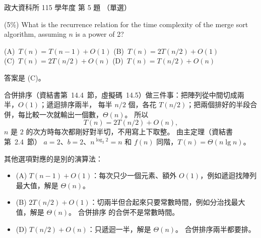\begin{pastexam}[label={px:nccu-115-dsa-05}]{政大資科所 115 學年度 第 5 題}
（單選）

(5\%) What is the recurrence relation for the time complexity of the merge sort algorithm, assuming $n$
is a power of 2?

(A)~$T(n)=T(n-1)+O(1)$ \qquad (B)~$T(n)=2T(n/2)+O(1)$\\
(C)~$T(n)=2T(n/2)+O(n)$ \qquad (D)~$T(n)=T(n/2)+O(n)$
\end{pastexam}

\begin{pastsoln}
答案是 (C)。

合併排序（資結書第~14.4~節，虛擬碼~14.5）做三件事：把陣列從中間切成兩半，$O(1)$；遞迴排序兩半，
每半 $n/2$ 個，各花 $T(n/2)$；把兩個排好的半段合併，每比較一次就輸出一個數，$\Theta(n)$。 所以
\[
T(n) = 2T(n/2) + O(n),
\]
$n$ 是 $2$ 的次方時每次都剛好對半切，不用寫上下取整。 由主定理（資結書第~2.4~節）
$a = 2$、$b = 2$、$n^{\log_2 2} = n$ 和 $f(n)$ 同階，$T(n) = \Theta(n\lg n)$。

其他選項對應的是別的演算法：
\begin{itemize}
\item (A) $T(n-1) + O(1)$：每次只少一個元素、額外 $O(1)$，例如遞迴找陣列最大值，解是 $\Theta(n)$。
\item (B) $2T(n/2) + O(1)$：切兩半但合起來只要常數時間，例如分治找最大值，解是 $\Theta(n)$。 合併排序
的合併不是常數時間。
\item (D) $T(n/2) + O(n)$：只遞迴一半，解是 $\Theta(n)$。 合併排序兩半都要排。
\end{itemize}
\end{pastsoln}
